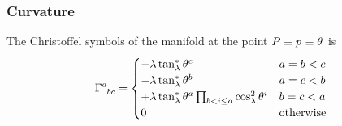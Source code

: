 \documentclass[../methodology.tex]{subfiles}
\begin{document}
\subsubsection{Curvature}
\begin{lemma}\label{M:Christoffel}
  The Christoffel symbols of the manifold
  at the point \(P\equiv\tensor{p}{}\equiv\tensor{\theta}{}\)
  is
  \[
    \tensor{\Gamma}{^a_b_c}=\begin{cases}
      -\lambda\tan_\lambda^\ast\tensor{\theta}{^c}                                                    & \text{\(a=b<c\)} \\
      -\lambda\tan_\lambda^\ast\tensor{\theta}{^b}                                                    & \text{\(a=c<b\)} \\
      +\lambda\tan_\lambda^\ast\tensor{\theta}{^a}\prod_{b<i\le a}{\cos_\lambda^2\tensor{\theta}{^i}} & \text{\(b=c<a\)} \\
      0                                                                                               & \text{otherwise} \\
    \end{cases}
  \]
\end{lemma}
\end{document}
